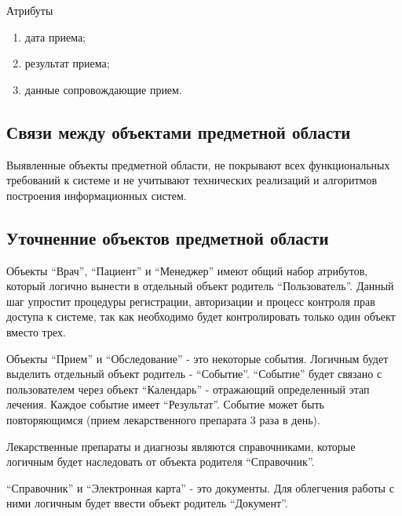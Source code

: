 Атрибуты
\begin{enumerate}
  \item дата приема; 
  \item результат приема; 
  \item данные сопровождающие прием. 
\end{enumerate}

\subsection{Связи между объектами предметной области}
Выявленные объекты предметной области, не покрывают всех функциональных
требований к системе и не учитывают технических реализаций и алгоритмов
построения информационных систем.

\subsection{Уточненние объектов предметной области}
Объекты “Врач”, “Пациент” и “Менеджер” имеют общий набор атрибутов, который
логично вынести в отдельный объект родитель “Пользователь”. Данный шаг упростит
процедуры регистрации, авторизации и процесс контроля прав доступа к системе,
так как необходимо будет контролировать только один объект вместо трех.

Объекты “Прием” и “Обследование” - это некоторые события. Логичным будет
выделить отдельный объект родитель - “Событие”. “Событие” будет связано с
пользователем через объект “Календарь” - отражающий определенный этап лечения.
Каждое событие имеет “Результат”. Событие может быть повторяющимся (прием
лекарственного препарата 3 раза в день). 

Лекарственные препараты и диагнозы являются справочниками, которые логичным
будет наследовать от объекта родителя “Справочник”.

“Справочник” и “Электронная карта” - это документы. Для облегчения работы с ними
логичным будет ввести объект родитель “Документ”.
 
 